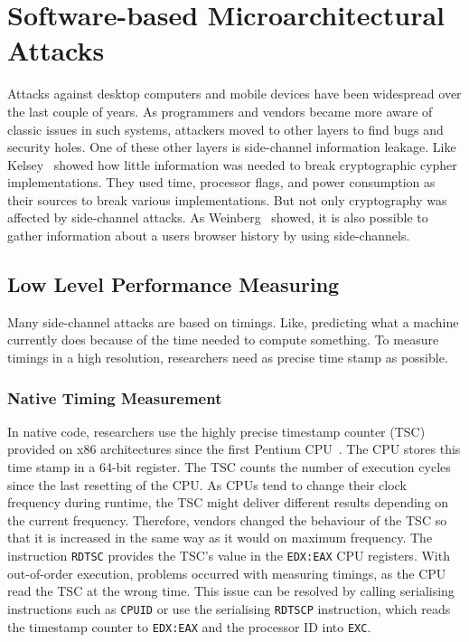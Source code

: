\section{Software-based Microarchitectural Attacks}

Attacks against desktop computers and mobile devices have been widespread over
the last couple of years. As programmers and vendors became more aware of
classic issues in such systems, attackers moved to other layers to find bugs and
security holes. One of these other layers is side-channel information leakage.
Like Kelsey~\etal\cite{kelsey1998side} showed how little information was needed
to break cryptographic cypher implementations. They used time, processor flags,
and power consumption as their sources to break various implementations. But not
only cryptography was affected by side-channel attacks. As
Weinberg~\etal\cite{weinberg2011still} showed, it is also possible to gather
information about a users browser history by using side-channels.

\subsection{Low Level Performance Measuring}

Many side-channel attacks are based on timings. Like, predicting what a machine
currently does because of the time needed to compute something. To measure
timings in a high resolution, researchers need as precise time stamp as
possible.

\subsubsection{Native Timing Measurement}

In native code, researchers use the highly precise timestamp counter (TSC)
provided on x86 architectures since the first Pentium CPU~\cite{intelsys}. The
CPU stores this time stamp in a 64-bit register. The TSC counts the number of
execution cycles since the last resetting of the CPU. As CPUs tend to change
their clock frequency during runtime, the TSC might deliver different results
depending on the current frequency. Therefore, vendors changed the behaviour of
the TSC so that it is increased in the same way as it would on maximum
frequency. The instruction \texttt{RDTSC} provides the TSC's value in the
\texttt{EDX:EAX} CPU registers. With out-of-order execution, problems occurred
with measuring timings, as the CPU read the TSC at the wrong time. This issue
can be resolved by calling serialising instructions such as \texttt{CPUID} or
use the serialising \texttt{RDTSCP} instruction, which reads the timestamp
counter to \texttt{EDX:EAX} and the processor ID into \texttt{EXC}.

